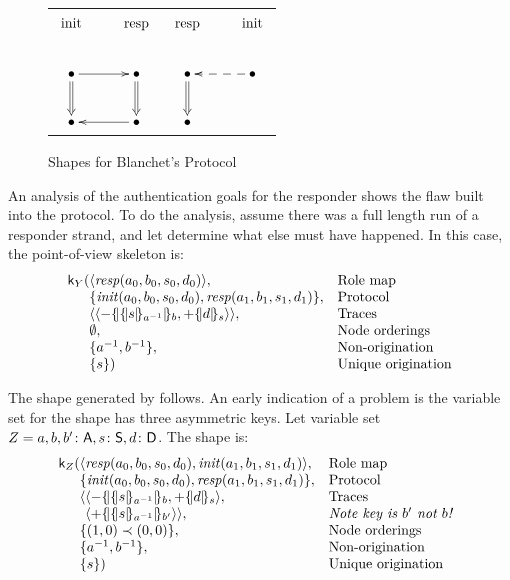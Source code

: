 \documentclass[12pt]{report}
\theoremstyle{definition}
\newcommand{\skel}{\mathsf{k}}
\newcommand{\init}{\fn{init}}
\newcommand{\resp}{\fn{resp}}
\begin{document}
\begin{figure}
\begin{center}
\begin{tabular}{c@{\qquad}c}
$\xymatrix{
\txt{\strut init}&\txt{\strut resp}\\
\bullet\ar@{=>}[d]\ar[r]&\bullet\ar@{=>}[d]\\
\bullet&\bullet\ar[l]}$
&
$\xymatrix{
\txt{\strut resp}&\txt{\strut init}\\
\bullet\ar@{=>}[d]&\bullet\ar@{-->}[l]\\
\bullet&}$
\end{tabular}
\end{center}
\caption{Shapes for Blanchet's Protocol}\label{fig:blanchet's protocol}
\end{figure}

An analysis of the authentication goals for the responder shows the
flaw built into the protocol.  To do the analysis, assume there was a
full length run of a responder strand, and let {\cpsa} determine what
else must have happened.  In this case, the point-of-view skeleton is:
$$\begin{array}{r@{}ll}
\skel_Y(
&\seq{\resp(a_0,b_0,s_0,d_0)},
&\mbox{Role map}\\
&\{\init(a_0,b_0,s_0,d_0),\resp(a_1,b_1,s_1,d_1)\},
&\mbox{Protocol}\\
&\seq{\seq{\inbnd\enc{\enc{s}{a^{-1}}}{b},\outbnd\enc{d}{s}}},
&\mbox{Traces}\\
&\emptyset,
&\mbox{Node orderings}\\
&\{a^{-1},b^{-1}\},
&\mbox{Non-origination}\\
&\{s\})
&\mbox{Unique origination}
\end{array}$$

The shape generated by {\cpsa} follows.  An early indication of a
problem is the variable set for the shape has three asymmetric keys.
Let variable set $Z=a,b,b'\colon\mathsf{A},s\colon\mathsf{S}, d\colon\mathsf{D}$.  The shape
is:
$$\begin{array}{r@{}ll}
\skel_Z(
&\seq{\resp(a_0,b_0,s_0,d_0),\init(a_1,b_1,s_1,d_1)},
&\mbox{Role map}\\
&\{\init(a_0,b_0,s_0,d_0),\resp(a_1,b_1,s_1,d_1)\},
&\mbox{Protocol}\\
&\langle\begin{array}[t]{@{}l}
\seq{\inbnd\enc{\enc{s}{a^{-1}}}{b},\outbnd\enc{d}{s}},\\
\seq{\outbnd\enc{\enc{s}{a^{-1}}}{b'}}\rangle,
\end{array}
&\begin{array}[t]{@{}l}
\mbox{Traces}\\
\mbox{\emph{Note key is $b'$ not $b$!}}
\end{array}\\
&\{(1,0)\prec(0,0)\},
&\mbox{Node orderings}\\
&\{a^{-1},b^{-1}\},
&\mbox{Non-origination}\\
&\{s\})
&\mbox{Unique origination}
\end{array}$$
\end{document}
